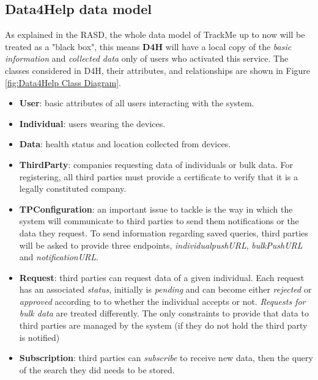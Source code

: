 \documentclass[a4paper, hidelinks, 12pt]{report}
\begin{document}
	\subsection{Data4Help data model}
	As explained in the RASD, the whole data model of TrackMe up to now will be treated as a "black box", this means \textbf{D4H} will have a local copy of the \textit{basic information} and \textit{collected data} only of users who activated this service. The classes considered in D4H, their attributes, and relationships are shown in Figure \ref{fig:Data4Help Class Diagram}.
	
	\begin{itemize}
		\item{\textbf{User}}: basic attributes of all users interacting with the system.
		\item{\textbf{Individual}}: users wearing the devices.
		\item{\textbf{Data}}: health status and location collected from devices.
		\item{\textbf{ThirdParty}}: companies requesting data of individuals or bulk data. For registering, all third parties must provide a certificate to verify that it is a legally constituted company.
		\item{\textbf{TPConfiguration}}: an important issue to tackle is the way in which the system will communicate to third parties to send them notifications or the data they request. To send information regarding saved queries, third parties will be asked to provide three endpoints,
	 \textit{individualpushURL}, \textit{bulkPushURL} and \textit{notificationURL}.
		\item{\textbf{Request}}: third parties can request data of a given individual. Each request has an associated \textit{status}, initially is \textit{pending} and can become either \textit{rejected} or \textit{approved} according to to whether the individual accepts or not. 
		\textit{Requests for bulk data} are treated differently. The only constraints to provide that data to third parties are managed by the system (if they do not hold the third party is notified)
		\item{\textbf{Subscription}}:  third parties can \textit{subscribe} to receive new data, then the query of the search they did needs to be stored. \\
	\end{itemize}
\end{document}
